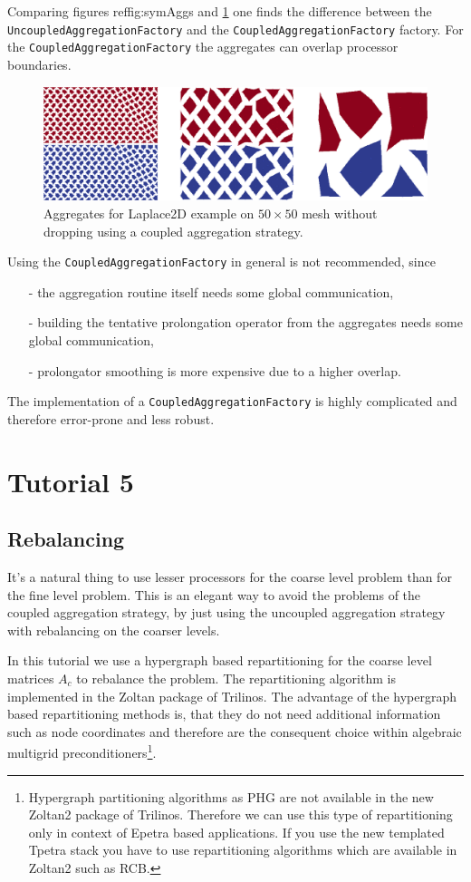 \documentclass[12pt,a4paper]{article}
\begin{document}
Comparing figures ref{fig:symAggs} and \ref{fig:nonsymAggsCoupled} one finds the difference between the \verb|UncoupledAggregationFactory| and the \verb|CoupledAggregationFactory| factory. For the \verb|CoupledAggregationFactory| the aggregates can overlap processor boundaries.
\begin{figure}
\includegraphics[width=\textwidth]{images/aggsSymmCoupled.png}
\caption{Aggregates for Laplace2D example on $50\times 50$ mesh without dropping using a coupled aggregation strategy.}
\label{fig:nonsymAggsCoupled}
\end{figure}

Using the \verb|CoupledAggregationFactory| in general is not recommended, since
\begin{itemize}
\item[-] the aggregation routine itself needs some global communication,
\item[-] building the tentative prolongation operator from the aggregates needs some global communication,
\item[-] prolongator smoothing is more expensive due to a higher overlap.
\end{itemize}
The implementation of a \verb|CoupledAggregationFactory| is highly complicated and therefore error-prone and less robust.

\section{Tutorial 5}
\subsection{Rebalancing}
It's a natural thing to use lesser processors for the coarse level problem than for the fine level problem. This is an elegant way to avoid the problems of the coupled aggregation strategy, by just using the uncoupled aggregation strategy with rebalancing on the coarser levels.

In this tutorial we use a hypergraph based repartitioning for the coarse level matrices $A_c$ to rebalance the problem. The repartitioning algorithm is implemented in the Zoltan package of Trilinos. The advantage of the hypergraph based repartitioning methods is, that they do not need additional information such as node coordinates and therefore are the consequent choice within algebraic multigrid preconditioners\footnote{Hypergraph partitioning algorithms as PHG are not available in the new Zoltan2 package of Trilinos. Therefore we can use this type of repartitioning only in context of Epetra based applications. If you use the new templated Tpetra stack you have to use repartitioning algorithms which are available in Zoltan2 such as RCB.}.
\end{document}
